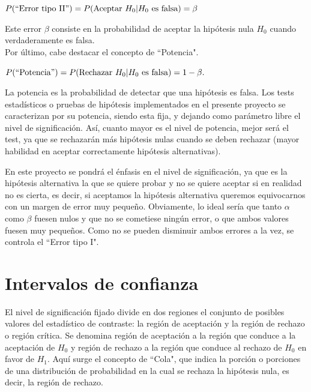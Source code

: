 \begin{center}
$P(\mbox{``Error tipo II}") = P(\mbox{Aceptar } H_0|H_0 \mbox{ es falsa}) =\beta$
\end{center}
Este error $\beta$ consiste en la probabilidad de aceptar la hipótesis nula $H_0$ cuando verdaderamente es
falsa.
\\Por último, cabe destacar el concepto de ``Potencia".
\begin{center}
$P(\mbox{``Potencia}") = P(\mbox{Rechazar } H_0|H_0 \mbox{ es falsa}) =1-\beta.$
\end{center}
La potencia es la probabilidad de detectar que una hipótesis es falsa. Los tests estadísticos o pruebas de hipótesis
implementados en el presente proyecto se caracterizan por su potencia, siendo esta fija, y dejando como parámetro
libre el nivel de significación. Así, cuanto mayor es el nivel de potencia, mejor será el test, ya que se rechazarán
más hipótesis nulas cuando se deben rechazar (mayor habilidad en aceptar correctamente hipótesis alternativas).

En este proyecto se pondrá el énfasis en el nivel de significación, ya que es la hipótesis alternativa la que se
quiere probar y no se quiere aceptar si en realidad no es cierta, es decir, si aceptamos la hipótesis alternativa
queremos equivocarnos con un margen de error muy pequeño. Obviamente, lo ideal sería que tanto $\alpha$ como
$\beta$ fuesen nulos y que no se cometiese ningún error, o que ambos valores fuesen muy pequeños. Como no se pueden
disminuir ambos errores a la vez, se controla el ``Error tipo I".


\section{Intervalos de confianza}
El nivel de significación fijado divide en dos regiones el conjunto de posibles valores del estadístico de
contraste: la región de aceptación y la región de rechazo o región crítica. Se denomina región de aceptación
a la región que conduce a la aceptación de $H_0$ y región de rechazo a la región que conduce al rechazo de $H_0$
en favor de $H_1$. Aquí surge el concepto de ``Cola", que indica la porción o porciones de una distribución
de probabilidad en la cual se rechaza la hipótesis nula, es decir, la región de rechazo.

